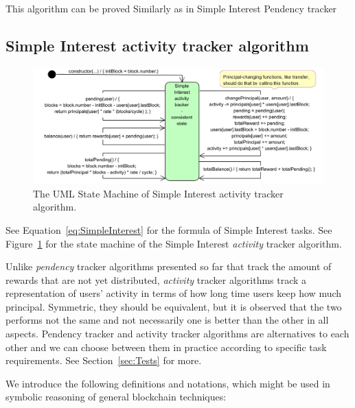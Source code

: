 \documentclass{article}
\begin{document}
This algorithm can be proved Similarly as in Simple Interest Pendency tracker

\subsection{Simple Interest activity tracker algorithm}
\label{sec:SimpleInterestActivity}

\begin{figure}[H]
  \centering
  \includegraphics[width=5.3in]{images/SimpleInterestActivity.jpg}
  \caption{The UML State Machine of Simple Interest activity tracker algorithm.}
  \label{fig:SimpleInterestActivity}
\end{figure}

See Equation~\ref{eq:SimpleInterest} for the formula of Simple Interest tasks.
See Figure~\ref{fig:SimpleInterestActivity} for the state machine of the Simple  
Interest \textit{activity} tracker algorithm. 

\label{sec:Pendency_vs_Activity}
Unlike \textit{pendency} tracker algorithms 
presented so far that track the amount of rewards that are not yet distributed,
\textit{activity} tracker algorithms track a representation of
users' activity in terms of how long time users keep how much principal.
Symmetric, they should be equivalent, but it is observed that the two performs 
not the same and not necessarily one is better than the other in all aspects.
Pendency tracker and activity tracker algorithms are alternatives to each other 
and we can choose between them in practice according to specific task requirements.
See Section~\ref{sec:Tests} for more.

We introduce the following definitions and notations, which might be used in  
symbolic reasoning of general blockchain techniques:
\end{document}
